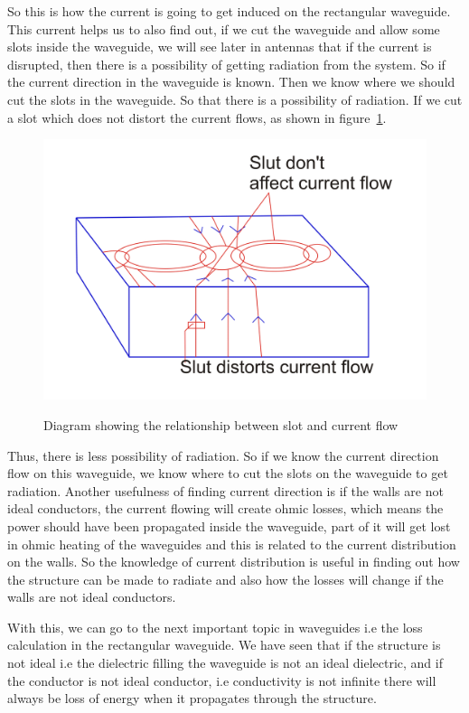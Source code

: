 So this is how the current is going to get induced on the rectangular waveguide. This current helps us to also find out, if we cut the waveguide and allow some slots inside the waveguide, we will see later in antennas that if the current is disrupted, then there is a possibility of getting radiation from the system. So if the current direction in the waveguide is known. Then we know where we should cut the slots in the waveguide. So that there is a possibility of radiation. If we cut a slot which does not distort the current flows, as shown in figure~\ref{fig:lectureimage10}.
\begin{figure}[h]
\centering
\includegraphics[width=1\linewidth]{./graphics/lecture-image-10.png}
\label{fig:lectureimage10}
\caption{Diagram showing the relationship between slot and current flow}
\end{figure}

Thus, there is less possibility of radiation. So if we know the current direction flow on this waveguide, we know where to cut the slots on the waveguide to get radiation. Another usefulness of finding current direction is if the walls are not ideal conductors, the current flowing will create ohmic losses, which means the power should have been propagated inside the waveguide, part of it will get lost in ohmic heating of the waveguides and this is related to the current distribution on the walls. So the knowledge of current distribution is useful in finding out how the structure can be made to radiate and also how the losses will change if the walls are not ideal conductors.
	
With this, we can go to the next important topic in waveguides i.e the loss calculation in the rectangular waveguide. We have seen that if the structure is not ideal i.e the dielectric filling the waveguide is not an ideal dielectric, and if the conductor is not ideal conductor, i.e conductivity is not infinite there will always be loss of energy when it propagates through the structure.

